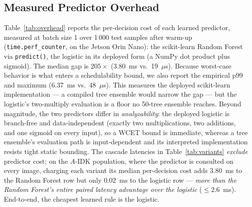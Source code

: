 \documentclass[conference]{IEEEtran}
\begin{document}
\begin{table}[h]
\centering
\caption{Cascade Variants, Threshold-0.7 $A$-IDK Population (95\% CIs)}
\label{tab:variants}
{\footnotesize\setlength{\tabcolsep}{2pt}}
\end{table}

\begin{table}[h]
\centering
\caption{Skip-Predictor Quality and Feature Ablation (95\% CIs on F1)}
\label{tab:skip-f1}
{\footnotesize\setlength{\tabcolsep}{3pt}}
\end{table}

\subsection{Measured Predictor Overhead}
Table~\ref{tab:overhead} reports the per-decision cost of each learned predictor, measured at batch size 1 over 1\,000 test samples after warm-up (\texttt{time.perf\_counter}, on the Jetson Orin Nano): the scikit-learn Random Forest via \texttt{predict()}, the logistic in its deployed form (a NumPy dot product plus sigmoid). The median gap is $205\times$ (3.80~ms vs.\ 19~$\mu$s). Because worst-case behavior is what enters a schedulability bound, we also report the empirical p99 and maximum (6.37~ms vs.\ 48~$\mu$s). This measures the deployed scikit-learn implementation --- a compiled tree ensemble would narrow the gap --- but the logistic's two-multiply evaluation is a floor no 50-tree ensemble reaches. Beyond magnitude, the two predictors differ in \emph{analyzability}: the deployed logistic is branch-free and data-independent (exactly two multiplications, two additions, and one sigmoid on every input), so a WCET bound is immediate, whereas a tree ensemble's evaluation path is input-dependent and its interpreted implementation resists tight static bounding. The cascade latencies in Table~\ref{tab:variants} \emph{exclude} predictor cost; on the $A$-IDK population, where the predictor is consulted on every image, charging each variant its median per-decision cost adds 3.80~ms to the Random Forest row but only 0.02~ms to the logistic row --- \emph{more than the Random Forest's entire paired latency advantage over the logistic} ($\le 2.6$~ms). End-to-end, the cheapest learned rule is the logistic.

\begin{table}[h]
\centering
\caption{Per-Decision Predictor Cost (Batch 1, Jetson Orin Nano)}
\label{tab:overhead}
{\footnotesize}
\end{table}
\end{document}
